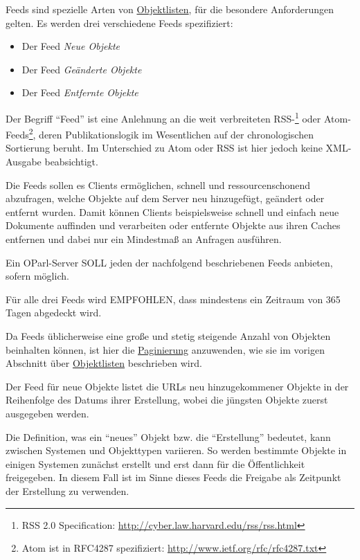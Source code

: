 \documentclass[,a4paper]{article}
\begin{document}
Feeds sind spezielle Arten von \hyperref[objektlisten]{Objektlisten},
für die besondere Anforderungen gelten. Es werden drei verschiedene
Feeds spezifiziert:

\begin{itemize}
\itemsep1pt\parskip0pt
\item
  Der Feed \emph{Neue Objekte}
\item
  Der Feed \emph{Geänderte Objekte}
\item
  Der Feed \emph{Entfernte Objekte}
\end{itemize}

Der Begriff ``Feed'' ist eine Anlehnung an die weit verbreiteten
RSS-\footnote{RSS 2.0 Specification:
  \url{http://cyber.law.harvard.edu/rss/rss.html}} oder
Atom-Feeds\footnote{Atom ist in RFC4287 spezifiziert:
  \url{http://www.ietf.org/rfc/rfc4287.txt}}, deren Publikationslogik im
Wesentlichen auf der chronologischen Sortierung beruht. Im Unterschied
zu Atom oder RSS ist hier jedoch keine XML-Ausgabe beabsichtigt.

Die Feeds sollen es Clients ermöglichen, schnell und ressourcenschonend
abzufragen, welche Objekte auf dem Server neu hinzugefügt, geändert oder
entfernt wurden. Damit können Clients beispielsweise schnell und einfach
neue Dokumente auffinden und verarbeiten oder entfernte Objekte aus
ihren Caches entfernen und dabei nur ein Mindestmaß an Anfragen
ausführen.

Ein OParl-Server SOLL jeden der nachfolgend beschriebenen Feeds
anbieten, sofern möglich.

Für alle drei Feeds wird EMPFOHLEN, dass mindestens ein Zeitraum von 365
Tagen abgedeckt wird.

Da Feeds üblicherweise eine große und stetig steigende Anzahl von
Objekten beinhalten können, ist hier die
\hyperref[paginierung]{Paginierung} anzuwenden, wie sie im vorigen
Abschnitt über \hyperref[objektlisten]{Objektlisten} beschrieben wird.


Der Feed für neue Objekte listet die URLs neu hinzugekommener Objekte in
der Reihenfolge des Datums ihrer Erstellung, wobei die jüngsten Objekte
zuerst ausgegeben werden.

Die Definition, was ein ``neues'' Objekt bzw. die ``Erstellung''
bedeutet, kann zwischen Systemen und Objekttypen variieren. So werden
bestimmte Objekte in einigen Systemen zunächst erstellt und erst dann
für die Öffentlichkeit freigegeben. In diesem Fall ist im Sinne dieses
Feeds die Freigabe als Zeitpunkt der Erstellung zu verwenden.
\end{document}
